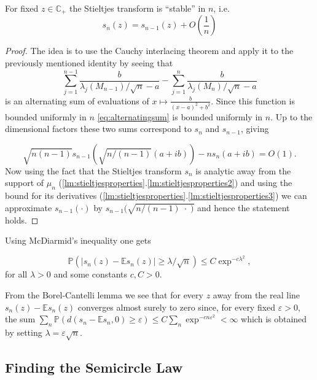 \begin{lemma}
	For fixed $z\in\mathbb C_+$ the Stieltjes transform is ``stable'' in $n$, i.e.
	\begin{equation*}
		s_n(z)=s_{n-1}(z)+O\left(\frac{1}{n}\right)
	\end{equation*}
\end{lemma}
\begin{proof}
	The idea is to use the Cauchy interlacing theorem and apply it to the previously mentioned identity by seeing that
	\begin{equation}\label{eq:alternatingsum}
		\sum_{j=1}^{n-1}\frac{b}{\lambda_j(M_{n-1})/\sqrt{n}-a}-\sum_{j=1}^n\frac{b}{\lambda_j(M_n)/\sqrt{n}-a}
	\end{equation}
	is an alternating sum of evaluations of $x\mapsto\frac{b}{(x-a)^2+b^2}$. Since this function is bounded uniformly in $n$ \eqref{eq:alternatingsum} is bounded uniformly in $n$. Up to the dimensional factors these two sums correspond to $s_n$ and $s_{n-1}$, giving
	
	$$\sqrt{n(n-1)}s_{n-1}(\sqrt{n/(n-1)}(a+ib))-ns_n(a+ib)=O(1).$$
	Now using the fact that the Stieltjes transform $s_n$ is analytic away from the support of $\mu_n$ (\ref{lm:stieltjesproperties}.\ref{lm:stieltjesproperties2}) and using the bound for its derivatives (\ref{lm:stieltjesproperties}.\ref{lm:stieltjesproperties3}) we can approximate $s_{n-1}(\cdot)$ by $s_{n-1}(\sqrt{n/(n-1) \;\cdot\; )}$ and hence the statement holds.
\end{proof}

Using McDiarmid's inequality one gets 

\begin{equation}\label{eq:concentrationOfStieltjesTransform}
	\mathbb P(|s_n(z)-\mathbb Es_n(z)|\geq\lambda/\sqrt n)\leq C\exp^{-c\lambda^2},
\end{equation}
 for all $\lambda>0$ and some constants $c,C>0$.

From the Borel-Cantelli lemma we see that for every $z$ away from the real line $s_n(z)-\mathbb Es_n(z)$ converges almost surely to zero since, for every fixed $\varepsilon>0$, the sum $\sum_n \mathbb P(d(s_n-\mathbb Es_n,0)\geq\varepsilon) \leq C\sum_n\exp^{-cn\varepsilon^2}<\infty$ which is obtained by setting $\lambda=\varepsilon\sqrt n$.

\subsection{Finding the Semicircle Law}

